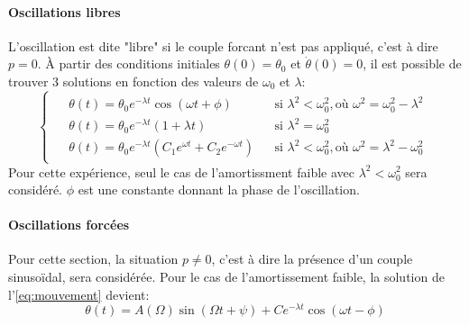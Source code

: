 \paragraph*{Oscillations libres}
L'oscillation est dite "libre" si le couple forcant n'est pas appliqué, c'est à dire \(p = 0\). À partir des conditions initiales \(\theta(0) = \theta_0\) et \(\dot\theta(0) = 0\), il est possible de trouver 3 solutions en fonction des valeurs de \(\omega_0\) et \(\lambda\):
\begin{equation}
    \begin{cases}
        \begin{aligned}
            &\theta(t) = \theta_0 e^{-\lambda t} \cos (\omega t + \phi) &&\textrm{si } \lambda^2 < \omega_0^2, \textrm{où } \omega^2 = \omega_0^2 - \lambda^2 \\
            &\theta(t) = \theta_0 e^{-\lambda t} (1 + \lambda t) &&\textrm{si } \lambda^2 = \omega_0^2 \\
            &\theta(t) = \theta_0 e^{-\lambda t} \left(C_1e^{\omega t} + C_2e^{-\omega t}\right) &&\textrm{si } \lambda^2 < \omega_0^2, \textrm{où } \omega^2 = \lambda^2 - \omega_0^2
        \end{aligned}
    \end{cases}
\end{equation}
Pour cette expérience, seul le cas de l'amortissment faible avec \(\lambda^2 < \omega_0^2\) sera considéré. \(\phi\) est une constante donnant la phase de l'oscillation.

\paragraph*{Oscillations forcées}
Pour cette section, la situation \(p \ne 0\), c'est à dire la présence d'un couple sinusoïdal, sera considérée. Pour le cas de l'amortissement faible, la solution de l'\autoref{eq:mouvement} devient:
\begin{equation}
    \theta(t) = A(\Omega) \sin(\Omega t + \psi) + C e^{-\lambda t} \cos(\omega t - \phi)
    \label{eq:oscillations_forcees}
\end{equation}

